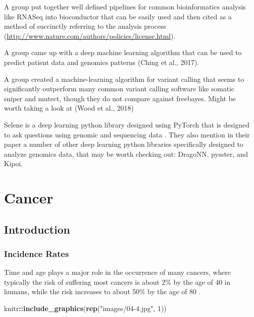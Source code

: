 \documentclass[]{book}
\newenvironment{Shaded}{\begin{snugshade}}{\end{snugshade}}
\newcommand{\DecValTok}[1]{\textcolor[rgb]{0.00,0.00,0.81}{#1}}
\newcommand{\KeywordTok}[1]{\textcolor[rgb]{0.13,0.29,0.53}{\textbf{#1}}}
\newcommand{\NormalTok}[1]{#1}
\newcommand{\OperatorTok}[1]{\textcolor[rgb]{0.81,0.36,0.00}{\textbf{#1}}}
\newcommand{\StringTok}[1]{\textcolor[rgb]{0.31,0.60,0.02}{#1}}
\begin{document}
A group put together well defined pipelines for common bioinformatics analysis like RNASeq into bioconductor that can be easily used and then cited as a method of succinctly referring to the analysis process (\url{http://www.nature.com/authors/policies/license.html}).

A group came up with a deep machine learning algorithm that can be used to predict patient data and genomics patterns (Ching et al., 2017).

A group created a machine-learning algorithm for variant calling that seems to significantly outperform many common variant calling software like somatic sniper and mutect, though they do not compare against freebayes. Might be worth taking a look at (Wood et al., 2018)

Selene is a deep learning python library designed using PyTorch that is designed to ask questions using genomic and sequencing data \citep{chen2019selene}. They also mention in their paper a number of other deep learning python libraries specifically designed to analyze genomics data, that may be worth checking out: DragoNN, pysster\citep{budach2018pysster}, and Kipoi\citep{avsec2018kipoi}.

\hypertarget{cancer}{%
\chapter{Cancer}\label{cancer}}

\hypertarget{introduction-4}{%
\section{Introduction}\label{introduction-4}}

\hypertarget{incidence-rates}{%
\subsection{Incidence Rates}\label{incidence-rates}}

Time and age plays a major role in the occurrence of many cancers, where typically the risk of suffering most cancers is about 2\% by the age of 40 in humans, while the risk increases to about 50\% by the age of 80 \citep{martincorena2015somatic}.

\begin{Shaded}
\begin{Highlighting}[]
\NormalTok{knitr}\OperatorTok{::}\KeywordTok{include_graphics}\NormalTok{(}\KeywordTok{rep}\NormalTok{(}\StringTok{"images/04-4.jpg"}\NormalTok{, }\DecValTok{1}\NormalTok{))}
\end{Highlighting}
\end{Shaded}
\end{document}
